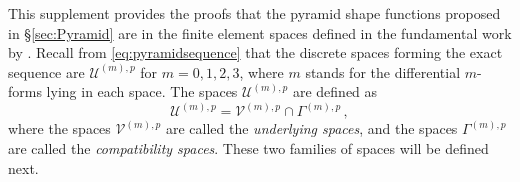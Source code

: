 This supplement provides the proofs that the pyramid shape functions proposed in \S\ref{sec:Pyramid} are in the finite element spaces  defined in the fundamental work by \citet{Nigam_Phillips_11}.
Recall from \eqref{eq:pyramidsequence} that the discrete spaces forming the exact sequence are $\mathcal{U}^{(m),p}$ for $m=0,1,2,3$, where $m$ stands for the differential $m$-forms lying in each space.
The spaces $\mathcal{U}^{(m),p}$ are defined as
\begin{equation}
	\mathcal{U}^{(m),p}=\mathcal{V}^{(m),p}\cap\Gamma^{(m),p}\,,
\end{equation}
where the spaces $\mathcal{V}^{(m),p}$ are called the \textit{underlying spaces}, and the spaces $\Gamma^{(m),p}$ are called the \textit{compatibility spaces}.
These two families of spaces will be defined next.

